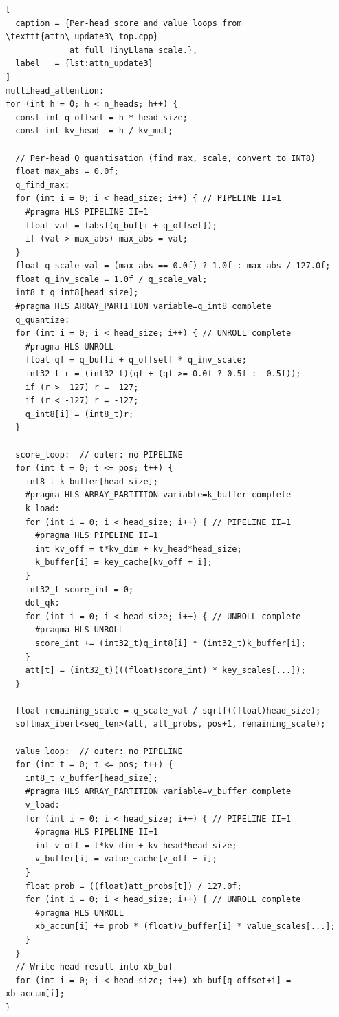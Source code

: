 \begin{lstlisting}[
  caption = {Per-head score and value loops from \texttt{attn\_update3\_top.cpp}
             at full TinyLlama scale.},
  label   = {lst:attn_update3}
]
multihead_attention:
for (int h = 0; h < n_heads; h++) {
  const int q_offset = h * head_size;
  const int kv_head  = h / kv_mul;

  // Per-head Q quantisation (find max, scale, convert to INT8)
  float max_abs = 0.0f;
  q_find_max:
  for (int i = 0; i < head_size; i++) { // PIPELINE II=1
    #pragma HLS PIPELINE II=1
    float val = fabsf(q_buf[i + q_offset]);
    if (val > max_abs) max_abs = val;
  }
  float q_scale_val = (max_abs == 0.0f) ? 1.0f : max_abs / 127.0f;
  float q_inv_scale = 1.0f / q_scale_val;
  int8_t q_int8[head_size];
  #pragma HLS ARRAY_PARTITION variable=q_int8 complete
  q_quantize:
  for (int i = 0; i < head_size; i++) { // UNROLL complete
    #pragma HLS UNROLL
    float qf = q_buf[i + q_offset] * q_inv_scale;
    int32_t r = (int32_t)(qf + (qf >= 0.0f ? 0.5f : -0.5f));
    if (r >  127) r =  127;
    if (r < -127) r = -127;
    q_int8[i] = (int8_t)r;
  }

  score_loop:  // outer: no PIPELINE
  for (int t = 0; t <= pos; t++) {
    int8_t k_buffer[head_size];
    #pragma HLS ARRAY_PARTITION variable=k_buffer complete
    k_load:
    for (int i = 0; i < head_size; i++) { // PIPELINE II=1
      #pragma HLS PIPELINE II=1
      int kv_off = t*kv_dim + kv_head*head_size;
      k_buffer[i] = key_cache[kv_off + i];
    }
    int32_t score_int = 0;
    dot_qk:
    for (int i = 0; i < head_size; i++) { // UNROLL complete
      #pragma HLS UNROLL
      score_int += (int32_t)q_int8[i] * (int32_t)k_buffer[i];
    }
    att[t] = (int32_t)(((float)score_int) * key_scales[...]);
  }

  float remaining_scale = q_scale_val / sqrtf((float)head_size);
  softmax_ibert<seq_len>(att, att_probs, pos+1, remaining_scale);

  value_loop:  // outer: no PIPELINE
  for (int t = 0; t <= pos; t++) {
    int8_t v_buffer[head_size];
    #pragma HLS ARRAY_PARTITION variable=v_buffer complete
    v_load:
    for (int i = 0; i < head_size; i++) { // PIPELINE II=1
      #pragma HLS PIPELINE II=1
      int v_off = t*kv_dim + kv_head*head_size;
      v_buffer[i] = value_cache[v_off + i];
    }
    float prob = ((float)att_probs[t]) / 127.0f;
    for (int i = 0; i < head_size; i++) { // UNROLL complete
      #pragma HLS UNROLL
      xb_accum[i] += prob * (float)v_buffer[i] * value_scales[...];
    }
  }
  // Write head result into xb_buf
  for (int i = 0; i < head_size; i++) xb_buf[q_offset+i] = xb_accum[i];
}
\end{lstlisting}

